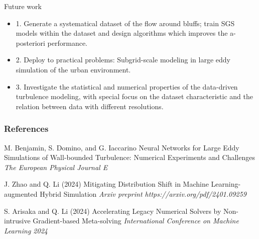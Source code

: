 \documentclass[paper slide]{beamer}
\begin{document}
\begin{frame}{Future work}
	\begin{itemize}
		\item 1. Generate a systematical dataset of the flow around bluffs; train SGS models within the dataset and design algorithms
		which improves the a-posteriori performance.
		\item 2. Deploy to practical problems: Subgrid-scale modeling in large eddy simulation of the
		urban environment.
		\item 3. Investigate the statistical and numerical properties of the data-driven turbulence modeling, with
		special focus on the dataset characteristic and the relation between data with different resolutions.
	\end{itemize}
\end{frame}

\begin{frame} %
    \frametitle{References}
 
    \begin{thebibliography}{99} %
        \footnotesize %
 
		M. Benjamin, S. Domino, and G. Iaccarino
		\newblock Neural Networks for Large Eddy Simulations of Wall-bounded Turbulence: Numerical Experiments and Challenges
		\newblock \emph{The European Physical Journal E}

        J. Zhao and Q. Li (2024)
        \newblock Mitigating Distribution Shift in Machine Learning-augmented Hybrid Simulation
        \newblock \emph{Arxiv preprint https://arxiv.org/pdf/2401.09259}

        S. Arisaka and Q. Li (2024)
        \newblock Accelerating Legacy Numerical Solvers by Non-intrusive Gradient-based Meta-solving
        \newblock \emph{International Conference on Machine Learning 2024}
 
        
    \end{thebibliography}
\end{frame}
\end{document}
